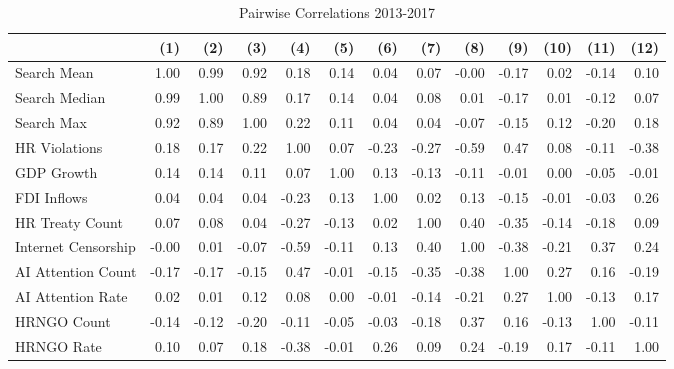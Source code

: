 \begin{table}[ht]
\centering
\begin{tabular}{|l|rrrrrrrrrrrr|}
  \hline
 & (1) & (2) & (3) & (4) & (5) & (6) & (7) & (8) & (9) & (10) & (11) & (12) \\ 
  \hline
Search Mean & 1.00 & 0.99 & 0.92 & 0.18 & 0.14 & 0.04 & 0.07 & -0.00 & -0.17 & 0.02 & -0.14 & 0.10 \\ 
  Search Median & 0.99 & 1.00 & 0.89 & 0.17 & 0.14 & 0.04 & 0.08 & 0.01 & -0.17 & 0.01 & -0.12 & 0.07 \\ 
  Search Max & 0.92 & 0.89 & 1.00 & 0.22 & 0.11 & 0.04 & 0.04 & -0.07 & -0.15 & 0.12 & -0.20 & 0.18 \\ 
  HR Violations & 0.18 & 0.17 & 0.22 & 1.00 & 0.07 & -0.23 & -0.27 & -0.59 & 0.47 & 0.08 & -0.11 & -0.38 \\ 
  GDP Growth & 0.14 & 0.14 & 0.11 & 0.07 & 1.00 & 0.13 & -0.13 & -0.11 & -0.01 & 0.00 & -0.05 & -0.01 \\ 
  FDI Inflows & 0.04 & 0.04 & 0.04 & -0.23 & 0.13 & 1.00 & 0.02 & 0.13 & -0.15 & -0.01 & -0.03 & 0.26 \\ 
  HR Treaty Count & 0.07 & 0.08 & 0.04 & -0.27 & -0.13 & 0.02 & 1.00 & 0.40 & -0.35 & -0.14 & -0.18 & 0.09 \\ 
  Internet Censorship & -0.00 & 0.01 & -0.07 & -0.59 & -0.11 & 0.13 & 0.40 & 1.00 & -0.38 & -0.21 & 0.37 & 0.24 \\ 
  AI Attention Count & -0.17 & -0.17 & -0.15 & 0.47 & -0.01 & -0.15 & -0.35 & -0.38 & 1.00 & 0.27 & 0.16 & -0.19 \\ 
  AI Attention Rate & 0.02 & 0.01 & 0.12 & 0.08 & 0.00 & -0.01 & -0.14 & -0.21 & 0.27 & 1.00 & -0.13 & 0.17 \\ 
  HRNGO Count & -0.14 & -0.12 & -0.20 & -0.11 & -0.05 & -0.03 & -0.18 & 0.37 & 0.16 & -0.13 & 1.00 & -0.11 \\ 
  HRNGO Rate & 0.10 & 0.07 & 0.18 & -0.38 & -0.01 & 0.26 & 0.09 & 0.24 & -0.19 & 0.17 & -0.11 & 1.00 \\ 
   \hline
\end{tabular}
\caption{Pairwise Correlations 2013-2017} 
\end{table}

